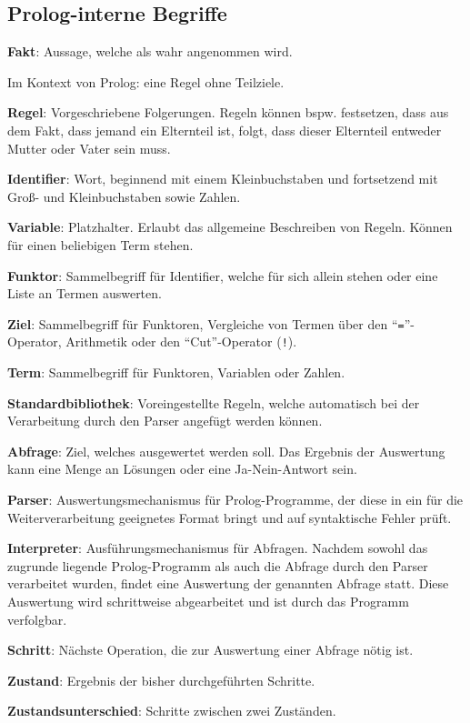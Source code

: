 \documentclass[parskip=full,11pt,twoside]{scrartcl}
\begin{document}
\subsection{Prolog-interne Begriffe}
\textbf{Fakt}:
Aussage, welche als wahr angenommen wird.

Im Kontext von Prolog: eine Regel ohne Teilziele.

\textbf{Regel}:
Vorgeschriebene Folgerungen. Regeln können bspw. festsetzen, dass aus dem Fakt, dass jemand ein Elternteil ist, folgt, dass dieser Elternteil entweder Mutter oder Vater sein muss.

\textbf{Identifier}:
Wort, beginnend mit einem Kleinbuchstaben und fortsetzend mit Groß- und Kleinbuchstaben sowie Zahlen.

\textbf{Variable}:
Platzhalter. Erlaubt das allgemeine Beschreiben von Regeln. Können für einen beliebigen Term stehen.

\textbf{Funktor}:
Sammelbegriff für Identifier, welche für sich allein stehen oder eine Liste an Termen auswerten.

\textbf{Ziel}:
Sammelbegriff für Funktoren, Vergleiche von Termen über den \enquote{\texttt{=}}-Operator, Arithmetik oder den \enquote{Cut}-Operator (\texttt{!}).

\textbf{Term}:
Sammelbegriff für Funktoren, Variablen oder Zahlen.

\textbf{Standardbibliothek}:
Voreingestellte Regeln, welche automatisch bei der Verarbeitung durch den Parser angefügt werden können.

\textbf{Abfrage}:
Ziel, welches ausgewertet werden soll. Das Ergebnis der Auswertung kann eine Menge an Lösungen oder eine Ja-Nein-Antwort sein.

\textbf{Parser}:
Auswertungsmechanismus für Prolog-Programme, der diese in ein für die Weiterverarbeitung geeignetes Format bringt und auf syntaktische Fehler prüft.

\textbf{Interpreter}:
Ausführungsmechanismus für Abfragen. Nachdem sowohl das zugrunde liegende Prolog-Programm als auch die Abfrage durch den Parser verarbeitet wurden, findet eine Auswertung der genannten Abfrage statt. Diese Auswertung wird schrittweise abgearbeitet und ist durch das Programm verfolgbar.

\textbf{Schritt}:
Nächste Operation, die zur Auswertung einer Abfrage nötig ist.

\textbf{Zustand}:
Ergebnis der bisher durchgeführten Schritte.

\textbf{Zustandsunterschied}:
Schritte zwischen zwei Zuständen.
\end{document}
